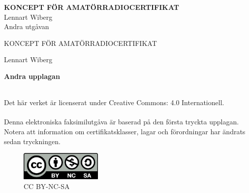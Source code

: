 \documentclass[a4paper,twoside,openright]{book}
\begin{document}
\AddToShipoutPicture*{\BackgroundPic}

\pagestyle{empty}



\onecolumn
\vspace{3cm}
\begin{center}
\Huge{\bfseries{\color{white}KONCEPT FÖR AMATÖRRADIOCERTIFIKAT}} \\[2ex]
\huge{\color{white}Lennart Wiberg} \\
\Large{\color{white}Andra utgåvan}
\end{center}

\clearpage





\vspace{10em}

\begin{center}
\Large{KONCEPT FÖR AMATÖRRADIOCERTIFIKAT}

Lennart Wiberg\\[2\baselineskip]
\end{center}


\noindent \textbf{Andra upplagan}
\begin{rev-granskat}[UEI]
\noindent
\\ 
\noindent Det här verket är licenserat under Creative Commons:\newline
\noindent{} 4.0 Internationell.
\\
\\
\noindent Denna elektroniska faksimilutgåva är baserad på den första tryckta
upplagan. Notera att information om certifikatsklasser, lagar och förordningar
har ändrats sedan tryckningen.
\end{rev-granskat}

\begin{figure}
    \includegraphics[width=4cm]{images/cc-by-nc-sa}
    \caption*{CC BY-NC-SA}
\end{figure}
\end{document}
